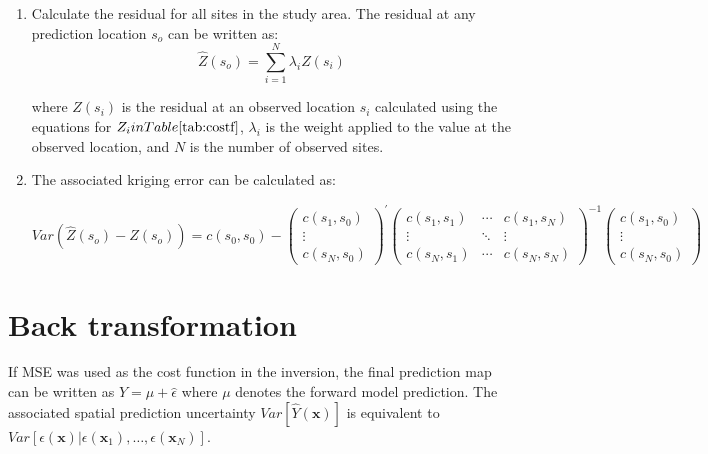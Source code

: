 \begin{enumerate}
    \item Calculate the residual for all sites in the study area. The residual at any prediction location $s_{o}$ can be written as:
    \begin{equation}
    \hat{Z}(s_{o}) = \sum_{i=1}^{N} \lambda_{i} Z(s_{i}) 
    \end{equation} \label{eq:simpkrig-app}

    where $Z(s_{i})$ is the residual at an observed location $s_{i}$ calculated using the equations for $Z_{i} in Table \ref{tab:costf}$, $\lambda_{i}$ is the weight applied to the value at the observed location, and $N$ is the number of observed sites. 
    
 
    
    \item The associated kriging error can be calculated as:
    
    \begin{equation}
    Var( \hat{Z}(s_{o})-  Z(s_{o}) )=
    c(s_{0}, s_{0}) - 
    \begin{pmatrix}
    c(s_{1}, s_{0})\\ 
    \vdots \\ 
    c(s_{N}, s_{0})
    \end{pmatrix}^{'} 
    \begin{pmatrix}
    c(s_{1}, s_{1}) &  \cdots & c(s_{1}, s_{N})  \\ 
    \vdots & \ddots  & \vdots\\ 
    c(s_{N}, s_{1}) & \cdots  & c(s_{N}, s_{N})  
    \end{pmatrix}^{-1}
    \begin{pmatrix}
    c(s_{1}, s_{0})\\ 
    \vdots \\ 
    c(s_{N}, s_{0})
    \end{pmatrix} 
    \end{equation} 
 
    
\end{enumerate}


\section{Back transformation}\label{supp-c-back}

If MSE was used as the cost function in the inversion, the final prediction map can be written as $\widehat{Y} = \mu + \hat{\epsilon}$ where $\mu$ denotes the forward model prediction. The associated spatial prediction uncertainty $Var[\widehat{Y}(\mathbf{x})]$ is equivalent to $Var\left[\epsilon(\mathbf{x})|\epsilon(\mathbf{x}_{1}), \dots, \epsilon(\mathbf{x}_{N})\right]$.

